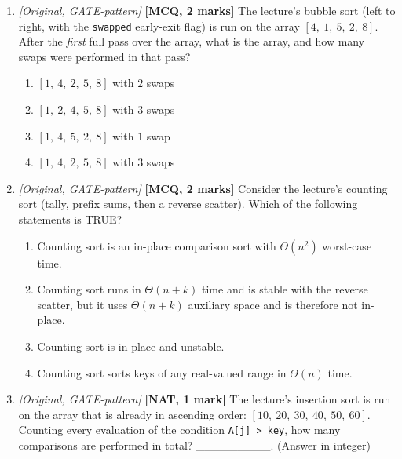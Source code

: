 \documentclass[11pt]{article}
\begin{document}
\begin{enumerate}
\item[\textbf{Q8}] \textit{[Original, GATE-pattern]} \textbf{[MCQ, 2 marks]} The lecture's bubble sort (left to right, with the \texttt{swapped} early-exit flag) is run on the array $[4,\ 1,\ 5,\ 2,\ 8]$. After the \emph{first} full pass over the array, what is the array, and how many swaps were performed in that pass?
\begin{enumerate}
  \item[(A)] $[1,\ 4,\ 2,\ 5,\ 8]$ with $2$ swaps
  \item[(B)] $[1,\ 2,\ 4,\ 5,\ 8]$ with $3$ swaps
  \item[(C)] $[1,\ 4,\ 5,\ 2,\ 8]$ with $1$ swap
  \item[(D)] $[1,\ 4,\ 2,\ 5,\ 8]$ with $3$ swaps
\end{enumerate}

\item[\textbf{Q9}] \textit{[Original, GATE-pattern]} \textbf{[MCQ, 2 marks]} Consider the lecture's counting sort (tally, prefix sums, then a reverse scatter). Which of the following statements is TRUE?
\begin{enumerate}
  \item[(A)] Counting sort is an in-place comparison sort with $\Theta(n^2)$ worst-case time.
  \item[(B)] Counting sort runs in $\Theta(n+k)$ time and is stable with the reverse scatter, but it uses $\Theta(n+k)$ auxiliary space and is therefore not in-place.
  \item[(C)] Counting sort is in-place and unstable.
  \item[(D)] Counting sort sorts keys of any real-valued range in $\Theta(n)$ time.
\end{enumerate}

\item[\textbf{Q10}] \textit{[Original, GATE-pattern]} \textbf{[NAT, 1 mark]} The lecture's insertion sort is run on the array that is already in ascending order: $[10,\ 20,\ 30,\ 40,\ 50,\ 60]$. Counting every evaluation of the condition \texttt{A[j] > key}, how many comparisons are performed in total? \_\_\_\_\_\_\_\_\_. (Answer in integer)

\end{enumerate}
\end{document}
